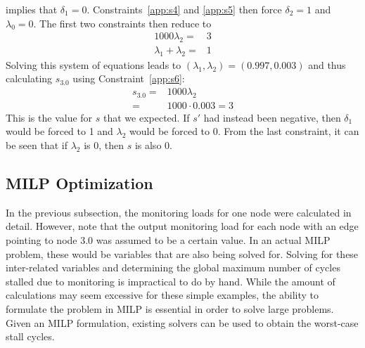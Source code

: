 implies that $\delta_1 = 0$. Constraints~\ref{app:s4} and \ref{app:s5} then
force $\delta_2 = 1$ and $\lambda_0 = 0$. The first two constraints then reduce
to
\begin{align*}
  1000\lambda_2 =& 3\\
  \lambda_1 + \lambda_2 =& 1 
\end{align*}
Solving this system of equations leads to $(\lambda_1, \lambda_2) = (0.997,
0.003)$ and thus calculating $s_{3.0}$ using Constraint~\ref{app:s6}:
\begin{align*}
  s_{3.0} =& 1000 \lambda_2 \\
  =& 1000 \cdot 0.003 = 3
\end{align*}
This is the value for $s$ that we expected. If $s'$ had instead been negative,
then $\delta_1$ would be forced to 1 and $\lambda_2$ would be forced to 0. From
the last constraint, it can be seen that if $\lambda_2$ is 0, then $s$ is also
0.

\subsection{MILP Optimization}

In the previous subsection, the monitoring loads for one node were calculated
in detail. However, note that the output monitoring load for each node with an
edge pointing to node 3.0 was assumed to be a certain value. In an actual MILP
problem, these would be variables that are also being solved for. Solving for
these inter-related variables and determining the global maximum number of
cycles stalled due to monitoring is impractical to do by hand.  While the
amount of calculations may seem excessive for these simple examples, the
ability to formulate the problem in MILP is essential in order to solve large
problems. Given an MILP formulation, existing solvers \cite{lpsolve, cplex} can
be used to obtain the worst-case stall cycles.

